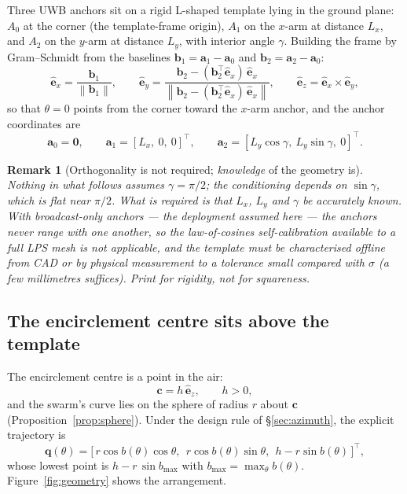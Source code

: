 \documentclass[11pt,a4paper]{article}
\newtheorem{remark}{Remark}
\newcommand{\ex}{\hat{\bm{e}}_x}
\newcommand{\ey}{\hat{\bm{e}}_y}
\newcommand{\ez}{\hat{\bm{e}}_z}
\newcommand{\q}{\bm{q}}
\newcommand{\av}{\bm{a}}
\newcommand{\bv}{\bm{b}}
\newcommand{\cv}{\bm{c}}
\newcommand{\norm}[1]{\left\lVert#1\right\rVert}
\begin{document}
Three UWB anchors sit on a rigid L-shaped template lying in the ground plane:
$A_0$ at the corner (the template-frame origin), $A_1$ on the $x$-arm at
distance $L_x$, and $A_2$ on the $y$-arm at distance $L_y$, with interior angle
$\gamma$. Building the frame by Gram--Schmidt from the baselines
$\bv_1 = \av_1-\av_0$ and $\bv_2 = \av_2-\av_0$:
\begin{equation}
\ex = \frac{\bv_1}{\norm{\bv_1}},
\qquad
\ey = \frac{\bv_2 - (\bv_2^\top \ex)\,\ex}{\norm{\bv_2 - (\bv_2^\top\ex)\,\ex}},
\qquad
\ez = \ex \times \ey ,
\label{eq:gramschmidt}
\end{equation}
so that $\theta=0$ points from the corner toward the $x$-arm anchor, and the
anchor coordinates are
\begin{equation}
\av_0 = \bm{0}, \qquad
\av_1 = [L_x,\ 0,\ 0]^\top, \qquad
\av_2 = [L_y\cos\gamma,\ L_y\sin\gamma,\ 0]^\top .
\label{eq:anchors}
\end{equation}

\begin{remark}[Orthogonality is not required; \emph{knowledge} of the geometry is]
\label{rem:selfcal}
Nothing in what follows assumes $\gamma=\pi/2$; the conditioning depends on
$\sin\gamma$, which is flat near $\pi/2$. What is required is that $L_x$, $L_y$
and $\gamma$ be accurately \emph{known}. With broadcast-only anchors --- the
deployment assumed here --- the anchors never range with one another, so the
law-of-cosines self-calibration available to a full LPS mesh is \emph{not}
applicable, and the template must be characterised offline from CAD or by
physical measurement to a tolerance small compared with $\sigma$ (a few
millimetres suffices). Print for rigidity, not for squareness.
\end{remark}

\subsection{The encirclement centre sits above the template}

The encirclement centre is a point in the air:
\begin{equation}
\cv = h\,\ez, \qquad h > 0 ,
\end{equation}
and the swarm's curve lies on the sphere of radius $r$ about $\cv$
(Proposition~\ref{prop:sphere}). Under the design rule of \S\ref{sec:azimuth},
the explicit trajectory is
\begin{equation}
\q(\theta) = \big[\,r\cos b(\theta)\cos\theta,\ \
                    r\cos b(\theta)\sin\theta,\ \
                    h - r\sin b(\theta)\,\big]^\top ,
\label{eq:trajectory}
\end{equation}
whose lowest point is $h - r\,\sin b_{\max}$ with
$b_{\max} = \max_\theta b(\theta)$. Figure~\ref{fig:geometry} shows the
arrangement.
\end{document}
